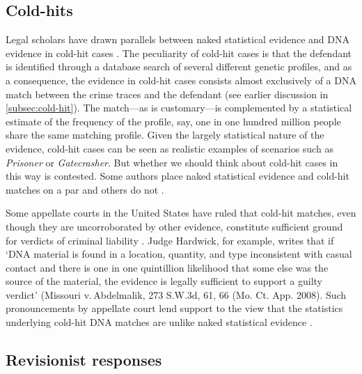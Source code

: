 \documentclass{article}
\begin{document}
 \subsection{Cold-hits}

Legal scholars have drawn parallels between naked statistical evidence and DNA evidence in cold-hit cases  \citep{ Roth2010}. 
The peculiarity of cold-hit cases  is that the defendant is identified through a database search of several different genetic profiles, and as a consequence, the evidence in cold-hit cases consists almost exclusively of a DNA match between the crime traces and the defendant (see earlier discussion in \ref{subsec:cold-hit}). The match---as is customary---is complemented by a statistical estimate of the frequency of the profile, say, one in one hundred million people share the same matching profile. Given the largely statistical nature of the evidence, cold-hit cases can be seen as realistic examples of  scenarios such as \textit{Prisoner} or \textit{Gatecrasher}.
But whether we should think about cold-hit cases in this way is contested. 
Some authors place naked statistical evidence 
and cold-hit matches on a par \citep{Smith_conviction_mind_2017} and others do not \citep{Enoch2012Statistical,enoch2015sense}.

 Some appellate courts in the United States have ruled that cold-hit matches, even though they are uncorroborated by other evidence, constitute sufficient ground for verdicts of criminal liability \citep{malcom2008}. Judge Hardwick, for example, writes that if `DNA material is found in a location, quantity, and type inconsistent with casual contact and there is one in one quintillion likelihood that some else was the source of the material, the evidence is legally sufficient to support a guilty verdict' (Missouri v.\,Abdelmalik, 273 S.W.3d, 61, 66 (Mo. Ct. App. 2008). Such pronouncements by appellate court lend support to the view that the statistics underlying cold-hit DNA matches are unlike naked statistical evidence  \citep{chengeAdNunn2016,dibello2019TrialStatisticsHigh}. 


 
 
 



\subsection{Revisionist responses}
\end{document}
